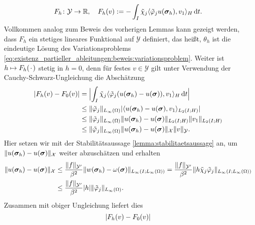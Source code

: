 \documentclass[../main.tex]{subfiles}
\begin{document}
\begin{Satz}
\begin{Beweis}
\begin{equation}
            F_{h} \colon \mathcal Y \to \mathbb{R}, \quad F_{h}(v) := - \int_{I} \tilde{\chi}_{j} \skp{\tilde{\varphi}_{j}  u(\bm\sigma_{h})}{v_{1}}{H} \diff t.
        \end{equation}
        Vollkommen analog zum Beweis des vorherigen Lemmas kann gezeigt werden, dass $F_{h}$ ein stetiges lineares Funktional auf $\mathcal Y$ definiert, das heißt, $\theta_{h}$ ist die eindeutige Lösung des Variationsproblems \cref{eq:existenz_partieller_ableitungen:beweis:variationsproblem}.
        Weiter ist $h \mapsto F_{h}(\blank)$ stetig in $h = 0$, denn für festes $v \in \mathcal Y$ gilt unter Verwendung der Cauchy-Schwarz-Ungleichung die Abschätzung
        \begin{align}
            \abs{F_{h}(v) - F_{0}(v)}
            &= \abs[\Big]{\int_{I} \tilde{\chi}_{j} \skp{\tilde{\varphi}_{j}  (u(\bm\sigma_{h}) - u(\bm\sigma))}{v_{1}}{H} \diff t }
            \\&\leq \norm{\tilde{\varphi}_{j}}_{L_{\infty}(\Omega)} \abs{\skp{u(\bm\sigma_{h}) - u(\bm\sigma)}{v_{1}}{L_{2}(I; H)} }
            \\&\leq \norm{\tilde{\varphi}_{j}}_{L_{\infty}(\Omega)} \norm{u(\bm\sigma_{h}) - u(\bm\sigma)}_{L_{2}(I; H)} \norm{v_{1}}_{L_{2}(I; H)}
            \\&\leq \norm{\tilde{\varphi}_{j}}_{L_{\infty}(\Omega)} \norm{u(\bm\sigma_{h}) - u(\bm\sigma)}_{\mathcal X} \norm{v}_{\mathcal Y}.
        \end{align}
        Hier setzen wir mit der Stabilitätsaussage \cref{lemma:stabilitaetsaussage} an, um $\norm{u(\bm\sigma_{h}) - u(\bm\sigma)}_{\mathcal X}$ weiter abzuschätzen und erhalten
        \begin{equation}
            \begin{aligned}
                \norm{u(\bm\sigma_{h}) - u(\bm\sigma)}_{\mathcal X}
                &\leq \frac{\norm{f}_{\mathcal Y'}}{\beta^{2}} \norm{w(\bm\sigma_{h}) - \omega(\bm\sigma)}_{L_{\infty}(I; L_{\infty}(\Omega))}
                = \frac{\norm{f}_{\mathcal Y'}}{\beta^{2}} \norm{h \tilde{\chi}_{j} \tilde{\varphi}_{j} }_{L_{\infty}(I; L_{\infty}(\Omega))}
                \\&\leq \frac{\norm{f}_{\mathcal Y'}}{\beta^{2}} \abs{h} \norm{\tilde{\varphi}_{j}}_{L_{\infty}(\Omega)}.
            \end{aligned}
        \end{equation}
        Zusammen mit obiger Ungleichung liefert dies
        \begin{equation}
            \abs{F_{h}(v) - F_{0}(v)}

\end{equation}
\end{Beweis}
\end{Satz}
\end{document}
